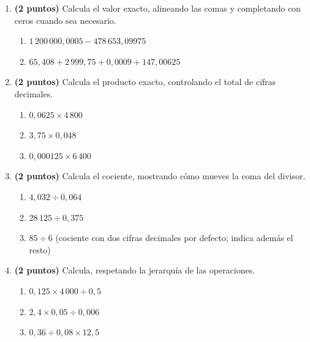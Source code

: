\documentclass[12pt, letterpaper]{article}
\begin{document}
\begin{enumerate}[leftmargin=*]

  \item \textbf{(2 puntos)} Calcula el valor exacto, alineando las comas y completando con ceros cuando sea necesario.
        \begin{enumerate}[label=\alph*), leftmargin=*]
          \item $1\,200\,000{,}0005 - 478\,653{,}09975$
          \item $65{,}408 + 2\,999{,}75 + 0{,}0009 + 147{,}00625$
        \end{enumerate}

  \item \textbf{(2 puntos)} Calcula el producto exacto, controlando el total de cifras decimales.
        \begin{enumerate}[label=\alph*), leftmargin=*]
          \item $0{,}0625 \times 4\,800$
          \item $3{,}75 \times 0{,}048$
          \item $0{,}000125 \times 6\,400$
        \end{enumerate}

  \item \textbf{(2 puntos)} Calcula el cociente, mostrando cómo mueves la coma del divisor.
        \begin{enumerate}[label=\alph*), leftmargin=*]
          \item $4{,}032 \div 0{,}064$
          \item $28\,125 \div 0{,}375$
          \item $85 \div 6$ \quad (cociente con dos cifras decimales por defecto; indica además el resto)
        \end{enumerate}

  \item \textbf{(2 puntos)} Calcula, respetando la jerarquía de las operaciones.
        \begin{enumerate}[label=\alph*), leftmargin=*]
          \item $0{,}125 \times 4\,000 \div 0{,}5$
          \item $2{,}4 \times 0{,}05 \div 0{,}006$
          \item $0{,}36 \div 0{,}08 \times 12{,}5$
        \end{enumerate}

\end{enumerate}

\end{document}

